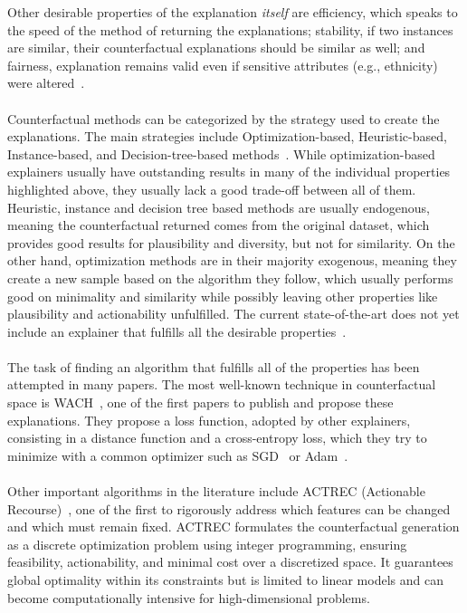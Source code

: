 \documentclass[12pt]{extarticle}
\numberwithin{equation}{section}
\begin{document}
Other desirable properties of the explanation \emph{itself} are
efficiency, which speaks to the speed of the method of returning the explanations; stability, if two instances are similar, their counterfactual explanations should be similar as well; and fairness, explanation remains valid even if sensitive attributes (e.g., ethnicity) were altered~\cite{guidotti2024counterfactual}.\\
\\
Counterfactual methods can be categorized by the strategy used to create the explanations. The main strategies include Optimization-based, Heuristic-based, Instance-based, and Decision-tree-based methods~\cite{guidotti2024counterfactual}. While optimization-based explainers usually have outstanding results in many of the individual properties highlighted above, they usually lack a good trade-off between all of them. Heuristic, instance and decision tree based methods are usually endogenous, meaning the counterfactual returned comes from the original dataset, which provides good results for plausibility and diversity, but not for similarity. On the other hand, optimization methods are in their majority exogenous, meaning they create a new sample based on the algorithm they follow, which usually performs good on minimality and similarity while possibly leaving other properties like plausibility and actionability unfulfilled. The current state-of-the-art does not yet include an explainer that fulfills all the desirable properties~\cite{guidotti2024counterfactual}.\\
\\
The task of finding an algorithm that fulfills all of the properties has been attempted in many papers. The most well-known technique in counterfactual space is WACH~\cite{wachter2017counterfactual}, one of the first papers to publish and propose these explanations. They propose a loss function, adopted by other explainers, consisting in a distance function and a cross-entropy loss, which they try to minimize with a common optimizer such as SGD~\cite{sgd} or Adam~\cite{adam}.\\
\\
Other important algorithms in the literature include ACTREC (Actionable Recourse)~\cite{ustun2019actionable}, one of the first to rigorously address which features can be changed and which must remain fixed. ACTREC formulates the counterfactual generation as a discrete optimization problem using integer programming, ensuring feasibility, actionability, and minimal cost over a discretized space. It guarantees global optimality within its constraints but is limited to linear models and can become computationally intensive for high-dimensional problems.\\
\end{document}
